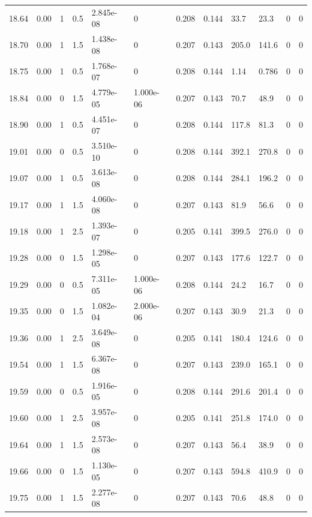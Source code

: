\documentclass[preview]{standalone}
\begin{document}
{{{{{{\begin{tabular}{L{1.2cm}C{1.2cm} C{0.3cm}C{0.5cm} C{1.4cm}C{1.4cm} C{1.4cm}C{1.4cm} C{1.6cm}C{1.6cm} C{1.6cm}C{1.6cm}}
  18.64  &  0.00  & 1     & 0.5 &  2.845e-08  & 0  &  0.208&   0.144& 33.7 & 23.3   &  0 & 0  \\ 
  18.70  &  0.00  & 1     & 1.5 &  1.438e-08  & 0  &  0.207&   0.143& 205.0 & 141.6   &  0 & 0  \\ 
  18.75  &  0.00  & 1     & 0.5 &  1.768e-07  & 0  &  0.208&   0.144& 1.14 & 0.786   &  0 & 0  \\ 
  18.84  &  0.00  & 0     & 1.5 &  4.779e-05  & 1.000e-06  &  0.207&   0.143& 70.7 & 48.9   &  0 & 0  \\ 
  18.90  &  0.00  & 1     & 0.5 &  4.451e-07  & 0  &  0.208&   0.144& 117.8 & 81.3   &  0 & 0  \\ 
  19.01  &  0.00  & 0     & 0.5 &  3.510e-10  & 0  &  0.208&   0.144& 392.1 & 270.8   &  0 & 0  \\ 
  19.07  &  0.00  & 1     & 0.5 &  3.613e-08  & 0  &  0.208&   0.144& 284.1 & 196.2   &  0 & 0  \\ 
  19.17  &  0.00  & 1     & 1.5 &  4.060e-08  & 0  &  0.207&   0.143& 81.9 & 56.6   &  0 & 0  \\ 
  19.18  &  0.00  & 1     & 2.5 &  1.393e-07  & 0  &  0.205&   0.141& 399.5 & 276.0   &  0 & 0  \\ 
  19.28  &  0.00  & 0     & 1.5 &  1.298e-05  & 0  &  0.207&   0.143& 177.6 & 122.7   &  0 & 0  \\ 
  19.29  &  0.00  & 0     & 0.5 &  7.311e-05  & 1.000e-06  &  0.208&   0.144& 24.2 & 16.7   &  0 & 0  \\ 
  19.35  &  0.00  & 0     & 1.5 &  1.082e-04  & 2.000e-06  &  0.207&   0.143& 30.9 & 21.3   &  0 & 0  \\ 
  19.36  &  0.00  & 1     & 2.5 &  3.649e-08  & 0  &  0.205&   0.141& 180.4 & 124.6   &  0 & 0  \\ 
  19.54  &  0.00  & 1     & 1.5 &  6.367e-08  & 0  &  0.207&   0.143& 239.0 & 165.1   &  0 & 0  \\ 
  19.59  &  0.00  & 0     & 0.5 &  1.916e-05  & 0  &  0.208&   0.144& 291.6 & 201.4   &  0 & 0  \\ 
  19.60  &  0.00  & 1     & 2.5 &  3.957e-08  & 0  &  0.205&   0.141& 251.8 & 174.0   &  0 & 0  \\ 
  19.64  &  0.00  & 1     & 1.5 &  2.573e-08  & 0  &  0.207&   0.143& 56.4 & 38.9   &  0 & 0  \\ 
  19.66  &  0.00  & 0     & 1.5 &  1.130e-05  & 0  &  0.207&   0.143& 594.8 & 410.9   &  0 & 0  \\ 
  19.75  &  0.00  & 1     & 1.5 &  2.277e-08  & 0  &  0.207&   0.143& 70.6 & 48.8   &  0 & 0  \\ 

\end{tabular}}}}}}}
\end{document}

